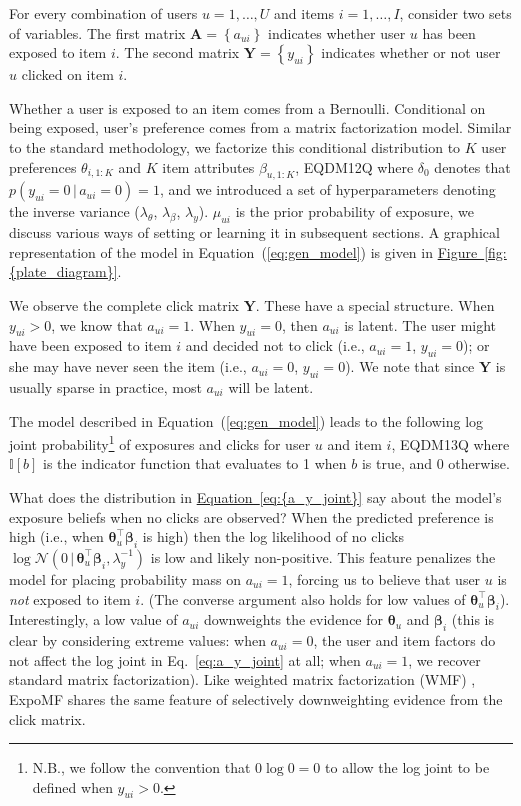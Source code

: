 \documentclass{sig-alternate-arxiv}
\begin{document}
For every combination of users $u=1,\dots,U$ and items $i=1,\dots,I$, consider two sets of variables. The first matrix ${ \boldsymbol{A}} = \left\{ a_{ui} \right\}$ indicates whether user $u$ has been exposed to item $i$. The second matrix ${ \boldsymbol{Y}} = \left\{ y_{ui} \right\}$ indicates whether or not user $u$ clicked on item $i$.

Whether a user is exposed to an item comes from a Bernoulli. Conditional on being exposed, user's preference comes from a matrix factorization model. Similar to the standard methodology, we factorize this conditional distribution to $K$ user preferences $\theta_{i,1:K}$ and $K$ item attributes $\beta_{u,1:K}$,
EQDM12Q
where $\delta_0$ denotes that $p(y_{ui} = 0 {\,\vert\,} a_{ui} = 0) = 1$, and we
introduced a set of hyperparameters denoting the inverse variance
($\lambda_\theta$, $\lambda_\beta$, $\lambda_y$). $\mu_{ui}$ is the prior
probability of exposure, we discuss various ways of setting or learning it
in subsequent sections. 
A graphical representation of the model in Equation~(\ref{eq:gen_model}) is given in {\hyperref[fig:{plate_diagram}]{Figure~\ref*{fig:{plate_diagram}}}}. 

We observe the complete click matrix ${ \boldsymbol{Y}}$. These have a special structure. When $y_{ui} > 0$, we know that $a_{ui} = 1$. When $y_{ui} = 0$, then $a_{ui}$ is latent. 
The user might have been exposed to item $i$ and decided not to click (i.e., $a_{ui}=1$, $y_{ui} = 0$); 
or she may have never seen the item (i.e., $a_{ui}=0$, $y_{ui}=0$). 
We note that since ${ \boldsymbol{Y}}$ is usually sparse in practice, 
most $a_{ui}$ will be latent.

The model described in Equation~(\ref{eq:gen_model})
leads to the following log joint probability\footnote{N.B., we follow the convention that $0 \log 0 = 0$ to allow the log joint to be defined when $y_{ui}>0$.} of exposures and clicks 
for user $u$ and item $i$,
EQDM13Q
where $\mathbb{I}[b]$ is the indicator function that evaluates to 1 when $b$ is true, and 0 otherwise. 

What does the distribution in {\hyperref[eq:{a_y_joint}]{Equation~\ref*{eq:{a_y_joint}}}} say 
about the model's exposure beliefs when no clicks are observed? 
When the predicted preference is high 
(i.e., when $\boldsymbol\theta_u^\top \boldsymbol\beta_i$ is high) 
then the log likelihood of no clicks $\log \mathcal{N}(0 {\,\vert\,} \boldsymbol\theta_u^\top \boldsymbol\beta_i, \lambda^{-1}_y)$ is low and likely non-positive.
This feature penalizes the model 
for placing probability mass on $a_{ui}=1$, 
forcing us to believe that user $u$ is \emph{not} exposed to item $i$. 
(The converse argument also holds for low values of $\boldsymbol\theta_u^\top \boldsymbol\beta_i$). 
Interestingly, a low value of $a_{ui}$ 
downweights the evidence for $\boldsymbol\theta_u$ and $\boldsymbol\beta_i$ 
(this is clear by considering extreme values: 
when $a_{ui}=0$, the user and item factors do not affect the log joint in Eq.~\ref{eq:a_y_joint} at all; 
when $a_{ui}=1$, we recover standard matrix factorization). 
Like weighted matrix factorization (WMF) \cite{hu2008collaborative}, ExpoMF shares the same feature of selectively downweighting evidence from the click matrix. 
\end{document}
